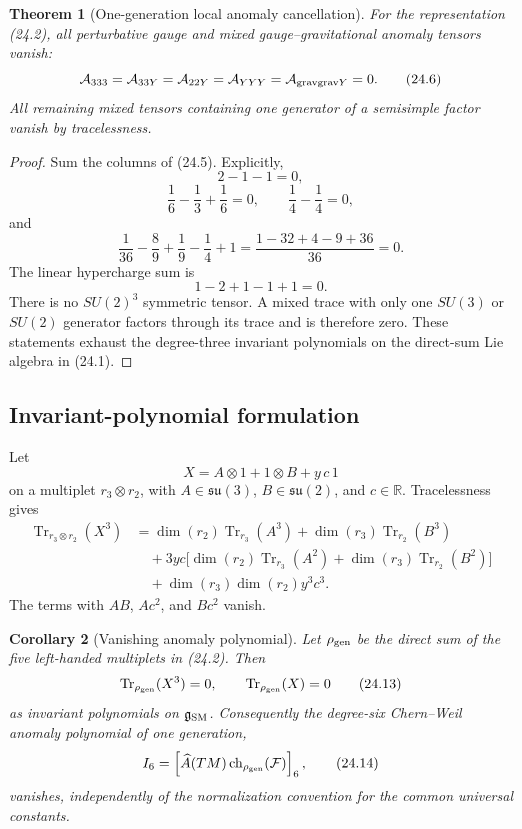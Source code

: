 \documentclass[11pt]{article}
\newtheorem{theorem}{Theorem}[section]
\newtheorem{corollary}[theorem]{Corollary}
\newcommand{\Tr}{\operatorname{Tr}}
\begin{document}
\begin{theorem}[One-generation local anomaly cancellation]
\label{thm:v11v24-local-cancellation}
For the representation (24.2), all perturbative gauge and mixed
gauge--gravitational anomaly tensors vanish:
\[
 \mathcal A_{333}=\mathcal A_{33Y}
 =\mathcal A_{22Y}=\mathcal A_{YYY}
 =\mathcal A_{{\rm grav}{\rm grav}Y}=0.
 \tag{24.6}
\]
All remaining mixed tensors containing one generator of a semisimple
factor vanish by tracelessness.
\end{theorem}

\begin{proof}
Sum the columns of (24.5).  Explicitly,
\[
 2-1-1=0,
 \tag{24.7}
\]
\[
 \frac16-\frac13+\frac16=0,
 \qquad
 \frac14-\frac14=0,
 \tag{24.8}
\]
and
\[
 \frac1{36}-\frac89+\frac19-\frac14+1
 =
 \frac{1-32+4-9+36}{36}=0.
 \tag{24.9}
\]
The linear hypercharge sum is
\[
 1-2+1-1+1=0.
 \tag{24.10}
\]
There is no \(SU(2)^3\) symmetric tensor.  A mixed trace with only one
\(SU(3)\) or \(SU(2)\) generator factors through its trace and is
therefore zero.  These statements exhaust the degree-three invariant
polynomials on the direct-sum Lie algebra in (24.1).
\end{proof}

\subsection{Invariant-polynomial formulation}

Let
\[
 X=A\otimes1+1\otimes B+y\,c\,1
 \tag{24.11}
\]
on a multiplet \(r_3\otimes r_2\), with
\(A\in\mathfrak{su}(3)\), \(B\in\mathfrak{su}(2)\), and
\(c\in\mathbb R\).  Tracelessness gives
\begin{align*}
 \Tr_{r_3\otimes r_2}(X^3)
 &=
 \dim(r_2)\Tr_{r_3}(A^3)
 +\dim(r_3)\Tr_{r_2}(B^3)\\
 &\quad+
 3yc\bigl[
 \dim(r_2)\Tr_{r_3}(A^2)
 +\dim(r_3)\Tr_{r_2}(B^2)
 \bigr]\\
 &\quad+
 \dim(r_3)\dim(r_2)y^3c^3.
 \tag{24.12}
\end{align*}
The terms with \(A B\), \(A c^2\), and \(B c^2\) vanish.

\begin{corollary}[Vanishing anomaly polynomial]
\label{cor:v11v24-polynomial}
Let \(\rho_{\rm gen}\) be the direct sum of the five left-handed
multiplets in (24.2).  Then
\[
 \Tr_{\rho_{\rm gen}}(X^3)=0,
 \qquad
 \Tr_{\rho_{\rm gen}}(X)=0
 \tag{24.13}
\]
as invariant polynomials on \(\mathfrak g_{\rm SM}\).
Consequently the degree-six Chern--Weil anomaly polynomial of one
generation,
\[
 I_6=
 \left[\widehat A(TM)\,
       {\rm ch}_{\rho_{\rm gen}}(\mathcal F)\right]_{6},
 \tag{24.14}
\]
vanishes, independently of the normalization convention for the common
universal constants.
\end{corollary}
\end{document}
